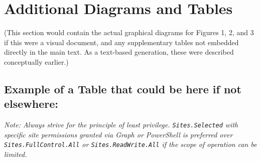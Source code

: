 \chapter{Additional Diagrams and Tables}
\label{appendix:AdditionalDiagramsTables}

(This section would contain the actual graphical diagrams for Figures 1, 2, and 3 if this were a visual document, and any supplementary tables not embedded directly in the main text. As a text-based generation, these were described conceptually earlier.)

\section*{Example of a Table that could be here if not elsewhere:}

\begin{table}[htbp]
    \centering
    \caption{Service Principal API Permissions (Example Minimal Set)}
    \label{tab:ServicePrincipalPermissions}
\end{table}

\textit{Note: Always strive for the principle of least privilege. \texttt{Sites.Selected} with specific site permissions granted via Graph or PowerShell is preferred over \texttt{Sites.FullControl.All} or \texttt{Sites.ReadWrite.All} if the scope of operation can be limited.}
